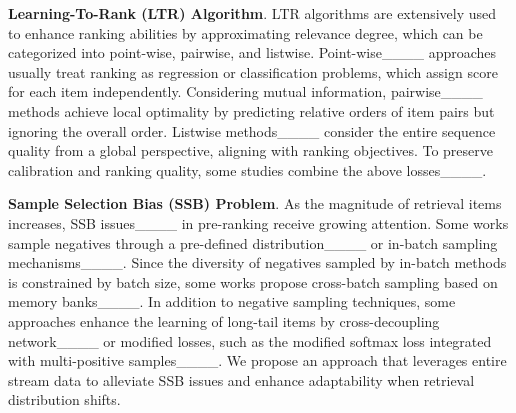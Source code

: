 \textbf{Learning-To-Rank (LTR) Algorithm}.
LTR algorithms are extensively used to enhance ranking abilities by approximating relevance degree, which can be categorized into point-wise, pairwise, and listwise.
Point-wise____ approaches usually treat ranking as regression or classification problems, which assign score for each item independently.
Considering mutual information, pairwise____ methods achieve local optimality by predicting relative orders of item pairs but ignoring the overall order.
Listwise methods____ consider the entire sequence quality from a global perspective, aligning with ranking objectives.
To preserve calibration and ranking quality, some studies combine the above losses____.

\textbf{Sample Selection Bias (SSB) Problem}.
As the magnitude of retrieval items increases, SSB issues____ in pre-ranking receive growing attention.
Some works sample negatives through a pre-defined distribution____ or in-batch sampling mechanisms____.
Since the diversity of negatives sampled by in-batch methods is constrained by batch size, some works propose cross-batch sampling based on memory banks____.
In addition to negative sampling techniques, some approaches enhance the learning of long-tail items by cross-decoupling network____ or modified losses, such as the modified softmax loss integrated with multi-positive samples____.
We propose an approach that leverages entire stream data to alleviate SSB issues and enhance adaptability when retrieval distribution shifts.

\vspace{-1mm}